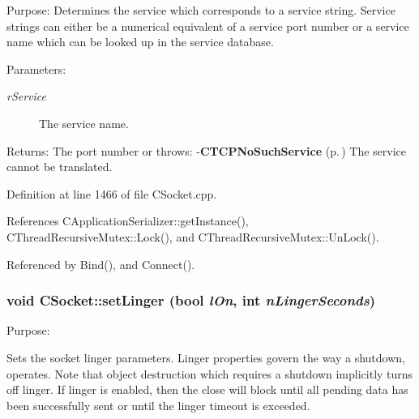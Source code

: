 Purpose: Determines the service which corresponds to a service string. Service strings can either be a numerical equivalent of a service port number or a service name which can be looked up in the service database.\begin{Desc}
\item[Parameters: ]\par
\begin{description}
\item[{\em 
r\-Service}]The service name.\end{description}
\end{Desc}
Returns: The port number or throws: -{\bf CTCPNo\-Such\-Service} {\rm (p.\,\pageref{classCTCPNoSuchService})} The service cannot be translated. 

Definition at line 1466 of file CSocket.cpp.

References CApplication\-Serializer::get\-Instance(), CThread\-Recursive\-Mutex::Lock(), and CThread\-Recursive\-Mutex::Un\-Lock().

Referenced by Bind(), and Connect().
\subsubsection{\setlength{\rightskip}{0pt plus 5cm}void CSocket::set\-Linger (bool {\em l\-On}, int {\em n\-Linger\-Seconds})}\label{classCSocket_a32}


Purpose:

Sets the socket linger parameters. Linger properties govern the way a shutdown, operates. Note that object destruction which requires a shutdown implicitly turns off linger.  If linger is enabled, then the close will block until all pending data has been successfully sent or until the linger timeout is exceeded.

